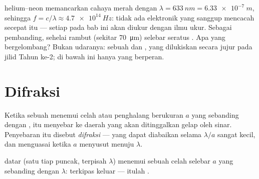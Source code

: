 \begin{example}\label{ex:g12:light-as-wave:orders}
 helium--neon memancarkan cahaya merah dengan
$\lambda = \qty{633}{nm} =
\qty{6.33e-7}{m}$, sehingga
$f = c/\lambda \approx \qty{4.7e14}{Hz}$: tidak ada elektronik yang
sanggup mencacah secepat itu --- setiap  pada bab ini
akan diukur dengan ilmu ukur. Sebagai pembanding, sehelai rambut
(sekitar \qty{70}{\micro m}) selebar seratus . Apa yang
bergelombang? Bukan udaranya: sebuah  dan ,
yang dilukiskan secara jujur pada jilid Tahun ke-2; di bawah ini hanya
 yang berperan.
\end{example}

\section{Difraksi}

\begin{definition}[Difraksi]\label{def:g12:light-as-wave:diffraction}
Ketika sebuah  menemui celah atau penghalang berukuran $a$
yang sebanding dengan ,  itu menyebar ke
daerah yang akan ditinggalkan gelap oleh sinar. Penyebaran itu disebut
\emph{difraksi} --- yang dapat diabaikan selama
$\lambda/a$ sangat kecil, dan menguasai ketika $a$ menyusut menuju
$\lambda$.
\end{definition}

\begin{omfigure}

{\small {} datar (satu tiap puncak, terpisah $\lambda$)
menemui sebuah celah selebar $a$ yang sebanding dengan $\lambda$:
 terkipas keluar --- itulah .}
\end{omfigure}

